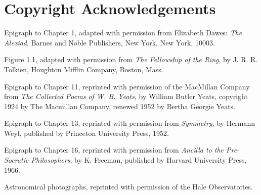 
\clearpage
\section*{Copyright Acknowledgements}

Epigraph to Chapter 1, adapted with permission from Elizabeth Dawes:
\emph{The Alexiad}, Barnes and Noble Publishers, New York, New York, 10003.

Figure 1.1, adapted with permission from \emph{The Fellowship of the Ring}, by
J. R. R. Tolkien, Houghton Mifflin Company, Boston, Mass.

Epigraph to Chapter 11, reprinted with permission of the MacMillan Company
from \emph{The Collected Poems of W. B. Yeats}, by William Butler Yeats,
copyright 1924 by The Macmillan Company, renewed 1952 by Bertha Georgie Yeats.

Epigraph to Chapter 13, reprinted with permission from \emph{Symmetry}, by
Hermann Weyl, published by Princeton University Press, 1952.

Epigraph to Chapter 16, reprinted with permission from \emph{Ancilla to the
Pre-Socratic Philosophers}, by K. Freeman, published by Harvard University
Press, 1966.

Astronomical photographs, reprinted with permission of the Hale Observatories.

